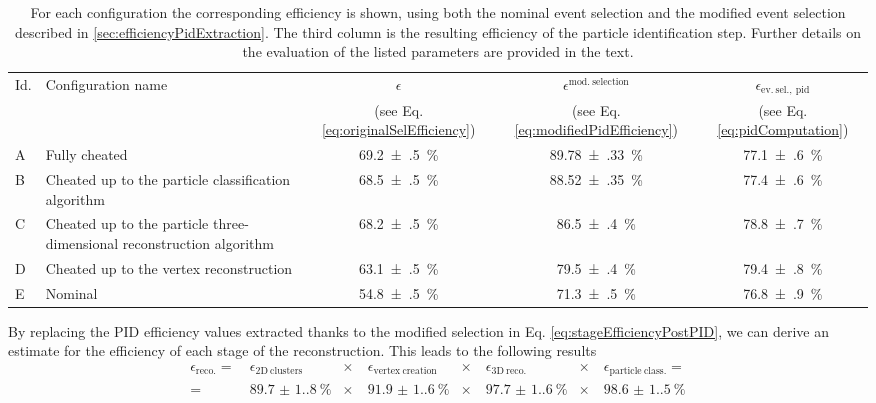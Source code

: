 \begin{table}[]
    \centering
    \caption[Particle identification efficiency for all configurations]{For each configuration the corresponding efficiency is shown, using both the nominal event selection and the modified event selection described in \autoref{sec:efficiencyPidExtraction}. The third column is the resulting efficiency of the particle identification step.  Further details on the evaluation of the listed parameters are provided in the text.}
    \label{tab:pidEfficiencyPerConfiguration}
    \begin{tabular}{lp{3.5cm}ccc}
        \hline
         Id. & Configuration name & $\epsilon$ & $\epsilon^\mathrm{mod.\ selection}$ & $\epsilon_\mathrm{ev.\ sel.,\ pid}$ \\
         & & (see Eq. \ref{eq:originalSelEfficiency}) & (see Eq. \ref{eq:modifiedPidEfficiency}) & (see Eq. \ref{eq:pidComputation})\\ 
         \hline
         A & Fully cheated & \SI{69.2(5)}{\percent} & \SI{89.78(33)}{\percent} & \SI{77.1(6)}{\percent} \\
         B & Cheated up to the particle classification algorithm & \SI{68.5(5)}{\percent} & \SI{88.52(35)}{\percent} & \SI{77.4(6)}{\percent} \\
         C & Cheated up to the particle three-dimensional reconstruction algorithm & \SI{68.2(5)}{\percent} & \SI{86.5(4)}{\percent} & \SI{78.8(7)}{\percent} \\
         D & Cheated up to the vertex reconstruction & \SI{63.1(5)}{\percent} & \SI{79.5(4)}{\percent} & \SI{79.4(8)}{\percent} \\
         E & Nominal & \SI{54.8(5)}{\percent} & \SI{71.3(5)}{\percent} & \SI{76.8(9)}{\percent} \\
         \hline
    \end{tabular}
\end{table}

By replacing the PID efficiency values extracted thanks to the modified selection in Eq. \eqref{eq:stageEfficiencyPostPID}, we can derive an estimate for the efficiency of each stage of the reconstruction. This leads to the following results \begin{equation}
    \begin{aligned}
        \epsilon_\mathrm{reco.} =&\
        \epsilon_\mathrm{2D\ clusters} &\times&\ 
        \epsilon_\mathrm{vertex\ creation} &\times&\ 
        \epsilon_\mathrm{3D\ reco.} &\times&\ 
        \epsilon_\mathrm{particle\ class.} =\\  
        =&\ \SI{89.7(1.8)}{\percent} &\times&\ 
        \SI{91.9(1.6)}{\percent} &\times&\ 
        \SI{97.7(1.6)}{\percent} &\times&\ 
        \SI{98.6(1.5)}{\percent}
    \end{aligned}\label{eq:results}
\end{equation}

